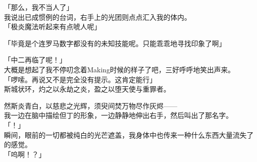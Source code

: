 「那么，我不当人了」\\

我说出已成惯例的台词，右手上的光团则点点汇入我的体内。\\

「极炎魔法听起来有点唬人呢」

「毕竟是个连罗马数字都没有的未知技能呢。只能乖乖地寻找印象了啊」

「中二再临了呢！」\\

大概是想起了我不停叨念着Making时候的样子了吧，三好呼呼地笑出声来。\\

「啰嗦。再说又不是完全没有提示。这肯定能行」\\

斯城状环，灼之以永劫之炎，盈之以堕天使与重罪者。

然斯炎青白，以慈悲之光辉，须臾间焚万物尽作灰烬——\\

我一边在脑中描绘但丁的形象，一边静静地伸出右手，然后叫出了那名字。\\

「！」\\

瞬间，眼前的一切都被纯白的光芒遮盖，我身体中也传来一种什么东西大量流失了的感觉。\\

「呜啊！？」\\

